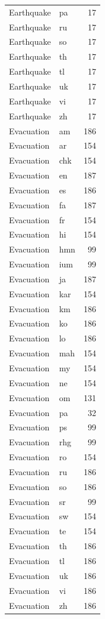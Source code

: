 \begin{longtable}{p{3cm} p{3cm} r}
Earthquake & pa & 17 \\
Earthquake & ru & 17 \\
Earthquake & so & 17 \\
Earthquake & th & 17 \\
Earthquake & tl & 17 \\
Earthquake & uk & 17 \\
Earthquake & vi & 17 \\
Earthquake & zh & 17 \\
Evacuation & am & 186 \\
Evacuation & ar & 154 \\
Evacuation & chk & 154 \\
Evacuation & en & 187 \\
Evacuation & es & 186 \\
Evacuation & fa & 187 \\
Evacuation & fr & 154 \\
Evacuation & hi & 154 \\
Evacuation & hmn & 99 \\
Evacuation & ium & 99 \\
Evacuation & ja & 187 \\
Evacuation & kar & 154 \\
Evacuation & km & 186 \\
Evacuation & ko & 186 \\
Evacuation & lo & 186 \\
Evacuation & mah & 154 \\
Evacuation & my & 154 \\
Evacuation & ne & 154 \\
Evacuation & om & 131 \\
Evacuation & pa & 32 \\
Evacuation & ps & 99 \\
Evacuation & rhg & 99 \\
Evacuation & ro & 154 \\
Evacuation & ru & 186 \\
Evacuation & so & 186 \\
Evacuation & sr & 99 \\
Evacuation & sw & 154 \\
Evacuation & te & 154 \\
Evacuation & th & 186 \\
Evacuation & tl & 186 \\
Evacuation & uk & 186 \\
Evacuation & vi & 186 \\
Evacuation & zh & 186 \\

\end{longtable}
